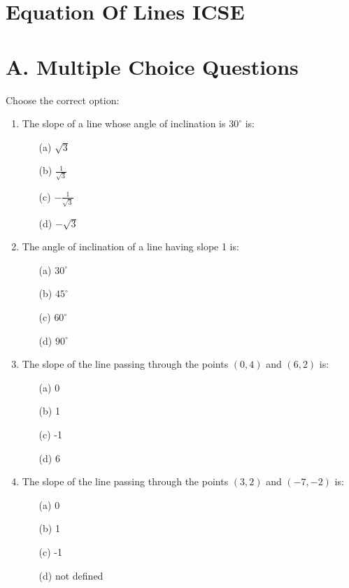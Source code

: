 \documentclass[12pt]{article}
\begin{document}
		\begin{multicols}{2}
	\section*{Equation Of Lines ICSE}
\section*{A. Multiple Choice Questions}

Choose the correct option:

\begin{enumerate}
	\item The slope of a line whose angle of inclination is \( 30^\circ \) is:
	\begin{itemize}
		\item[(a)] \( \sqrt{3} \)
		\item[(b)] \( \frac{1}{\sqrt{3}} \)
		\item[(c)] \( -\frac{1}{\sqrt{3}} \)
		\item[(d)] \( -\sqrt{3} \)
	\end{itemize}
	
	\item The angle of inclination of a line having slope 1 is:
	\begin{itemize}
		\item[(a)] \( 30^\circ \)
		\item[(b)] \( 45^\circ \)
		\item[(c)] \( 60^\circ \)
		\item[(d)] \( 90^\circ \)
	\end{itemize}
	
	\item The slope of the line passing through the points \( (0, 4) \) and \( (6, 2) \) is:
	\begin{itemize}
		\item[(a)] 0
		\item[(b)] 1
		\item[(c)] -1
		\item[(d)] 6
	\end{itemize}
	
	\item The slope of the line passing through the points \( (3, 2) \) and \( (-7, -2) \) is:
	\begin{itemize}
		\item[(a)] 0
		\item[(b)] 1
		\item[(c)] -1
		\item[(d)] not defined
	\end{itemize}
	

\end{enumerate}
\end{multicols}
\end{document}
